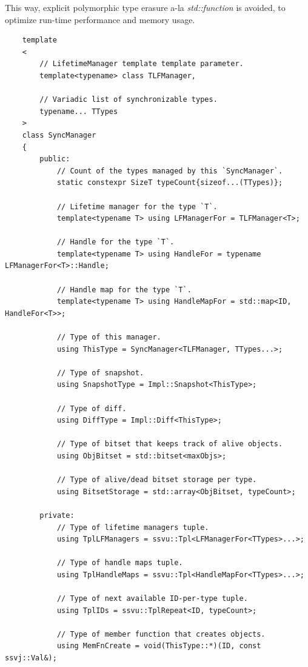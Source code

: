 \documentclass{report}
\begin{document}
                This way, explicit polymorphic type erasure a-la \emph{std::function} is avoided, to optimize run-time performance and memory usage.

\begin{verbatim}
    template
    <
        // LifetimeManager template template parameter.
        template<typename> class TLFManager, 

        // Variadic list of synchronizable types.
        typename... TTypes
    > 
    class SyncManager
    {
        public:
            // Count of the types managed by this `SyncManager`.
            static constexpr SizeT typeCount{sizeof...(TTypes)};

            // Lifetime manager for the type `T`.
            template<typename T> using LFManagerFor = TLFManager<T>;

            // Handle for the type `T`.
            template<typename T> using HandleFor = typename LFManagerFor<T>::Handle;

            // Handle map for the type `T`.
            template<typename T> using HandleMapFor = std::map<ID, HandleFor<T>>;

            // Type of this manager.
            using ThisType = SyncManager<TLFManager, TTypes...>;

            // Type of snapshot.
            using SnapshotType = Impl::Snapshot<ThisType>;

            // Type of diff.
            using DiffType = Impl::Diff<ThisType>;

            // Type of bitset that keeps track of alive objects.
            using ObjBitset = std::bitset<maxObjs>;

            // Type of alive/dead bitset storage per type.
            using BitsetStorage = std::array<ObjBitset, typeCount>;

        private:
            // Type of lifetime managers tuple.
            using TplLFManagers = ssvu::Tpl<LFManagerFor<TTypes>...>;

            // Type of handle maps tuple.
            using TplHandleMaps = ssvu::Tpl<HandleMapFor<TTypes>...>;

            // Type of next available ID-per-type tuple.
            using TplIDs = ssvu::TplRepeat<ID, typeCount>;

            // Type of member function that creates objects.
            using MemFnCreate = void(ThisType::*)(ID, const ssvj::Val&);


\end{verbatim}
\end{document}
